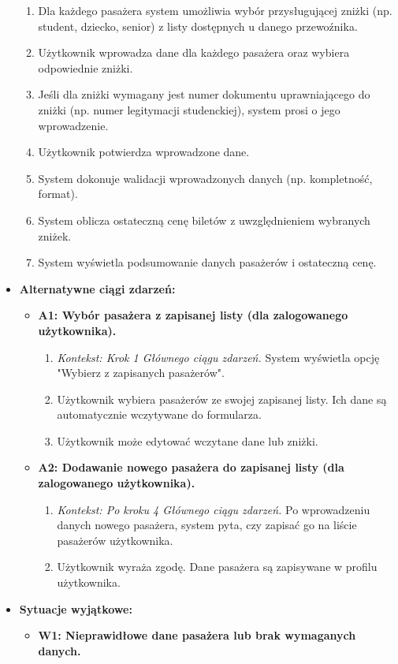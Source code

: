 \documentclass[a4paper,12pt]{article}
\begin{document}
\begin{itemize}
\begin{enumerate}
\item Dla każdego pasażera system umożliwia wybór przysługującej zniżki (np. student, dziecko, senior) z listy dostępnych u danego przewoźnika.
\item Użytkownik wprowadza dane dla każdego pasażera oraz wybiera odpowiednie zniżki.
\item Jeśli dla zniżki wymagany jest numer dokumentu uprawniającego do zniżki (np. numer legitymacji studenckiej), system prosi o jego wprowadzenie.
\item Użytkownik potwierdza wprowadzone dane.
\item System dokonuje walidacji wprowadzonych danych (np. kompletność, format).
\item System oblicza ostateczną cenę biletów z uwzględnieniem wybranych zniżek.
\item System wyświetla podsumowanie danych pasażerów i ostateczną cenę.
\end{enumerate}
\item \textbf{Alternatywne ciągi zdarzeń:}
\begin{itemize}
\item \textbf{A1: Wybór pasażera z zapisanej listy (dla zalogowanego użytkownika).}
\begin{enumerate}
\item \textit{Kontekst: Krok 1 Głównego ciągu zdarzeń.} System wyświetla opcję "Wybierz z zapisanych pasażerów".
\item Użytkownik wybiera pasażerów ze swojej zapisanej listy. Ich dane są automatycznie wczytywane do formularza.
\item Użytkownik może edytować wczytane dane lub zniżki.
\end{enumerate}
\item \textbf{A2: Dodawanie nowego pasażera do zapisanej listy (dla zalogowanego użytkownika).}
\begin{enumerate}
\item \textit{Kontekst: Po kroku 4 Głównego ciągu zdarzeń.} Po wprowadzeniu danych nowego pasażera, system pyta, czy zapisać go na liście pasażerów użytkownika.
\item Użytkownik wyraża zgodę. Dane pasażera są zapisywane w profilu użytkownika.
\end{enumerate}
\end{itemize}
\item \textbf{Sytuacje wyjątkowe:}
\begin{itemize}
\item \textbf{W1: Nieprawidłowe dane pasażera lub brak wymaganych danych.}

\end{itemize}
\end{itemize}
\end{document}
